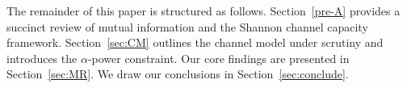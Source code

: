 \documentclass[conference]{IEEEtran}
\theoremstyle{definition}
\theoremstyle{plain}
\newcommand{\mh}[1]{\textcolor{red}{#1}}
\begin{document}

The remainder of this paper is structured as follows. 
Section~\ref{pre-A} provides a succinct review of mutual information and the Shannon channel capacity framework. Section~\ref{sec:CM} outlines the channel model under scrutiny and introduces the \(\alpha\)-power constraint.
Our core findings are presented in Section~\ref{sec:MR}. We draw our conclusions in Section~\ref{sec:conclude}.
\color{black}

\end{document}
